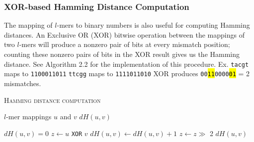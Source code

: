 \documentclass[oneside,12pt]{DISCSthesis}
\begin{document}
{		\subsubsection{XOR-based Hamming Distance Computation}
			The mapping of $l$-mers to binary numbers  is also useful for computing Hamming distances. An Exclusive OR (XOR) bitwise operation between the mappings of two $l$-mers will produce a nonzero pair of bits at every mismatch position; counting these nonzero pairs of bits in the XOR result gives us the Hamming distance. See Algorithm 2.2 for the implementation of this procedure.\newline
			\noindent\hspace*{40pt} {\small Ex.	\texttt{tacgt} maps to \texttt{1100011011} \newline
				\vspace*{2pt}\hspace*{62pt} \texttt{ttcgg} maps to \texttt{1111011010} \newline				
				\hspace*{62pt}	XOR produces \hspace*{3pt}\texttt{00\hl{11}0000\hl{01}} = 2 mismatches.}
			\newpage

		{ %
			\noindent \hspace*{6pt}{\bf Algorithm 2.2} \textsc{Hamming distance computation}\small
			\begin{algorithmic}[1]\label{alg:hamming-distance-comp}
				\Require $l$-mer mappings $u$ and $v$
				\Ensure $dH(u,v)$\vspace*{6pt}

				\State $dH(u,v) = 0$
				\State $z \leftarrow u$ \texttt{XOR} $v$
				\State $dH(u,v) \leftarrow dH(u,v) + 1$
				\EndIf
				\State $z \leftarrow z \gg$ 2 			\hspace{150pt}
				\EndFor
				\State\Return $dH(u,v)$
				\end{algorithmic}
			}\bigskip\bigskip\bigskip

}
\end{document}

